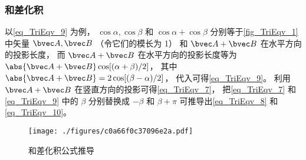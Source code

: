 \subsubsection{和差化积}
以\autoref{eq_TriEqv_9} 为例， $\cos \alpha, \cos \beta$ 和 $\cos \alpha + \cos \beta$ 分别等于\autoref{fig_TriEqv_1} 中矢量 $\bvec A, \bvec B$ （令它们的模长为 1） 和 $\bvec A + \bvec B$ 在水平方向的投影长度， 而 $\bvec A + \bvec B$ 在水平方向的投影长度等为 $\abs{\bvec A + \bvec B}\cos[(\alpha+\beta)/2]$， 其中 $\abs{\bvec A + \bvec B} = 2\cos [(\beta-\alpha)/2]$， 代入可得\autoref{eq_TriEqv_9}。 利用 $\bvec A + \bvec B$ 在竖直方向的投影可得\autoref{eq_TriEqv_7}， 把\autoref{eq_TriEqv_7} 和\autoref{eq_TriEqv_9} 中的 $\beta$ 分别替换成 $-\beta$ 和 $\beta+\pi$ 可推导出\autoref{eq_TriEqv_8} 和\autoref{eq_TriEqv_10}。
\begin{figure}[ht]
\centering
\texttt{[image: ./figures/c0a66f0c37096e2a.pdf]}
\caption{和差化积公式推导} \label{fig_TriEqv_1}
\end{figure}
